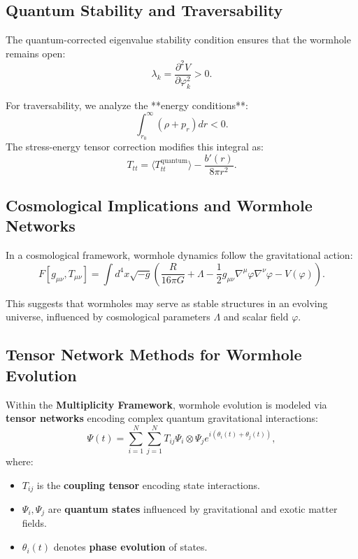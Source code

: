 \documentclass{article}
\theoremstyle{plain}
\begin{document}
\begin{itemize}
\begin{itemize}
\subsection{Quantum Stability and Traversability}

The quantum-corrected eigenvalue stability condition ensures that the wormhole remains open:
\begin{equation}
\lambda_k = \frac{\partial^2 V}{\partial \varphi_k^2} > 0.
\end{equation}

For traversability, we analyze the **energy conditions**:
\begin{equation}
\int_{r_0}^{\infty} (\rho + p_r) dr < 0.
\end{equation}
The stress-energy tensor correction modifies this integral as:
\begin{equation}
T_{tt} = \langle T_{tt}^{\text{quantum}} \rangle - \frac{b'(r)}{8\pi r^2}.
\end{equation}

\subsection{Cosmological Implications and Wormhole Networks}

In a cosmological framework, wormhole dynamics follow the gravitational action:
\begin{equation}
F [g_{\mu\nu}, T_{\mu\nu}] = \int d^4x \sqrt{-g} \left( \frac{R}{16\pi G} + \Lambda - \frac{1}{2} g_{\mu\nu} \nabla^\mu \varphi \nabla^\nu \varphi - V(\varphi) \right).
\end{equation}

This suggests that wormholes may serve as stable structures in an evolving universe, influenced by cosmological parameters $\Lambda$ and scalar field $\varphi$.

\subsection{Tensor Network Methods for Wormhole Evolution}
Within the \textbf{Multiplicity Framework}, wormhole evolution is modeled via \textbf{tensor networks} encoding complex quantum gravitational interactions:
\begin{equation}
\Psi(t) = \sum_{i=1}^{N} \sum_{j=1}^{N} T_{ij} \Psi_i \otimes \Psi_j e^{i(\theta_i(t) + \theta_j(t))},
\end{equation}
where:
\begin{itemize}
    \item $T_{ij}$ is the \textbf{coupling tensor} encoding state interactions.
    \item $\Psi_i, \Psi_j$ are \textbf{quantum states} influenced by gravitational and exotic matter fields.
    \item $\theta_i(t)$ denotes \textbf{phase evolution} of states.
\end{itemize}


\end{itemize}
\end{itemize}
\end{document}
